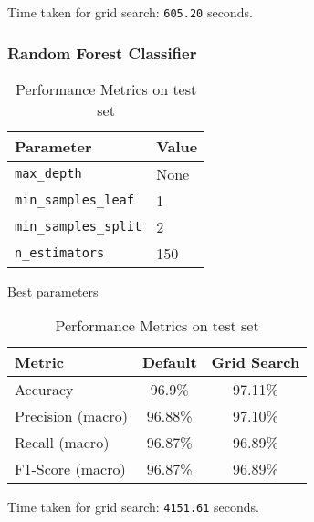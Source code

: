 Time taken for grid search: \texttt{605.20} seconds.

\subsubsection{Random Forest Classifier}
\begin{table}[h!]
  \begin{minipage}{.5\linewidth}
    \centering
    \begin{tabular}{|l|l|}
      \hline
      \textbf{Parameter} & \textbf{Value} \\
      \hline
      \texttt{max\_depth} & None \\
      \texttt{min\_samples\_leaf} & 1 \\
      \texttt{min\_samples\_split} & 2 \\
      \texttt{n\_estimators} & 150 \\
      \hline
    \end{tabular}
    \caption{Best parameters}
  \end{minipage}%
  \begin{minipage}{.5\linewidth}
    \centering
    \begin{tabular}{|l|c|c|}
      \hline
      \textbf{Metric} & \textbf{Default} & \textbf{Grid Search} \\
      \hline
      Accuracy & 96.9\% & 97.11\% \\
      Precision (macro) & 96.88\% & 97.10\% \\
      Recall (macro) & 96.87\% & 96.89\% \\
      F1-Score (macro) & 96.87\% & 96.89\% \\
      \hline
    \end{tabular}
    \caption{Performance Metrics on test set}
  \end{minipage}
\end{table}

Time taken for grid search: \texttt{4151.61} seconds.


